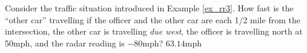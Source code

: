 {Consider the traffic situation introduced in Example \ref{ex_rr3}. How fast is the ``other car'' travelling if the officer and the other car are each 1/2 mile from the intersection, the other car is travelling \textit{due west}, the officer is travelling north at 50mph, and the radar reading is $-80$mph?
}
{$63.14$mph
}

